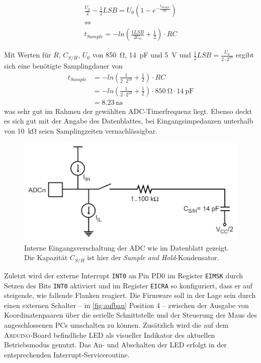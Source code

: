 		\begin{gather}
			\frac{U_0}{2} - \frac{1}{2}LSB = U_0 \left( 1 - e^{-\frac{t_{Sample}}{RC}} \right) \nonumber \\
			\Leftrightarrow \nonumber \\
			t_{Sample} = -ln\left( \frac{1LSB}{2U_0} + \frac{1}{2}\right) \cdot RC
			\label{eq:samplingzeit}
		\end{gather}

		Mit Werten für \(R\), \(C_{S/H}\), \(U_0\) von \SI{850}{\ohm}, \SI{14}{\pico\farad} und \SI{5}{\volt} und \(\frac{1}{2}LSB = \frac{U_0}{2 \cdot 2^{10}}\) ergibt sich eine benötigte Samplingdauer von
		\begin{align}
			t_{Sample}	&= -ln\left( \frac{1}{2\cdot 2^{10}} + \frac{1}{2}\right) \cdot RC \nonumber \\
						&= -ln\left( \frac{1}{2\cdot 2^{10}} + \frac{1}{2}\right) \cdot \SI{850}{\ohm} \cdot \SI{14}{\pico\farad} \nonumber \\
						&= \SI{8,23}{\nano\second}
			\label{eq:samplingzeit gerechnet}
		\end{align}
		was sehr gut im Rahmen der gewählten ADC-Timerfrequenz liegt.
		Ebenso deckt es sich gut mit der Angabe des Datenblattes, bei Eingangsimpedanzen unterhalb von \SI{10}{\kilo\ohm} seien Samplingzeiten vernachlässigbar.
		\begin{figure}[ht]
			\centering
			\includegraphics[width=.8\textwidth]{fig/raster/adc-input-circuit.png}
			\caption[Interne Eingangsverschaltung der ADC]{Interne Eingangsverschaltung der ADC wie im Datenblatt gezeigt. Die Kapazität \(C_{S/H}\) ist hier der \textit{Sample and Hold}-Kondensator.}
			\label{fig:analog input circuitry}
		\end{figure}

		Zuletzt wird der externe Interrupt \texttt{INT0} an Pin PD0 im Register \texttt{EIMSK} durch Setzen des Bits \texttt{INT0} aktiviert und im Register \texttt{EICRA} so konfiguriert, dass er auf steigende, wie fallende Flanken reagiert.
		Die Firmware soll in der Lage sein durch einen externen Schalter -- in \cref{fig:aufbau} Position 4 -- zwischen der Ausgabe von Koordinatenpaaren über die serielle Schnittstelle und der Steuerung der Maus des angeschlossenen PCs umschalten zu können. Zusätzlich wird die auf dem \textsc{Arduino}-Board befindliche LED als visueller Indikator des aktuellen Betriebsmodus genutzt.
		Das An- und Abschalten der LED erfolgt in der entsprechenden Interrupt-Serviceroutine.\par

